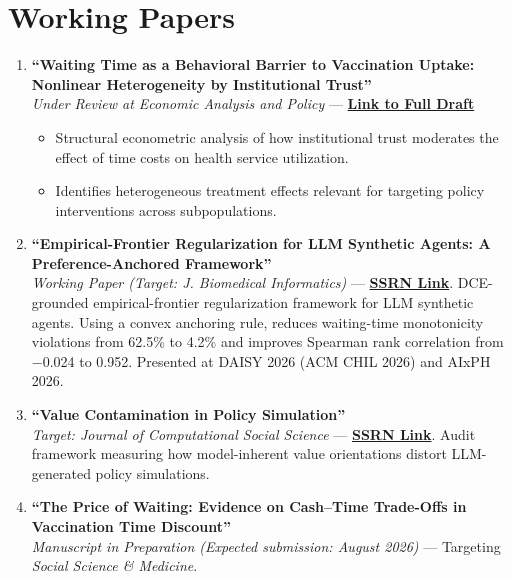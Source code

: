 \documentclass[11pt, letterpaper]{article}
\begin{document}
\section*{Working Papers}
\begin{enumerate}
    \item \textbf{``Waiting Time as a Behavioral Barrier to Vaccination Uptake: Nonlinear Heterogeneity by Institutional Trust''} \\
    \textit{Under Review at Economic Analysis and Policy} --- \href{https://yichao2022.github.io/jmp.pdf}{\textbf{Link to Full Draft}}
    \begin{itemize}[noitemsep, topsep=0pt]
        \item Structural econometric analysis of how institutional trust moderates the effect of time costs on health service utilization.
        \item Identifies heterogeneous treatment effects relevant for targeting policy interventions across subpopulations.
    \end{itemize}

    \item \textbf{``Empirical-Frontier Regularization for LLM Synthetic Agents: A Preference-Anchored Framework''} \\
    \textit{Working Paper (Target: J. Biomedical Informatics)} --- \href{https://papers.ssrn.com/sol3/papers.cfm?abstract_id=6686418}{\textbf{SSRN Link}}. DCE-grounded empirical-frontier regularization framework for LLM synthetic agents. Using a convex anchoring rule, reduces waiting-time monotonicity violations from 62.5\% to 4.2\% and improves Spearman rank correlation from $-$0.024 to 0.952. Presented at DAISY 2026 (ACM CHIL 2026) and AIxPH 2026.

    \item \textbf{``Value Contamination in Policy Simulation''} \\
    \textit{Target: Journal of Computational Social Science} --- \href{https://papers.ssrn.com/sol3/papers.cfm?abstract_id=6876161}{\textbf{SSRN Link}}. Audit framework measuring how model-inherent value orientations distort LLM-generated policy simulations.

    \item \textbf{``The Price of Waiting: Evidence on Cash--Time Trade-Offs in Vaccination Time Discount''} \\
    \textit{Manuscript in Preparation (Expected submission: August 2026)} --- Targeting \textit{Social Science \& Medicine}.
\end{enumerate}
\end{document}
